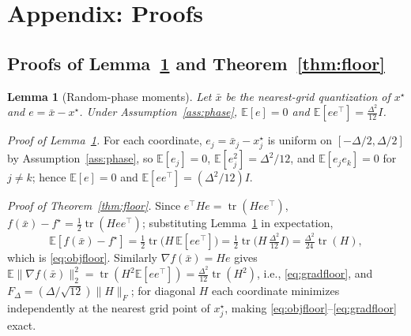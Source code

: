 \documentclass{article}
\newtheorem{lemma}{Lemma}
\newcommand{\E}{\mathbb{E}}
\newcommand{\D}{\Delta}
\begin{document}
\section{Appendix: Proofs}
\subsection{Proofs of Lemma~\ref{lem:phase} and Theorem~\ref{thm:floor}}
\begin{lemma}[Random-phase moments]
\label{lem:phase}
Let $\bar x$ be the nearest-grid quantization of $x^\star$ and $e=\bar x-x^\star$. Under Assumption~\ref{ass:phase}, $\E[e]=0$ and $\E[ee^\top]=\frac{\D^2}{12}I$.
\end{lemma}
\emph{Proof of Lemma~\ref{lem:phase}.} For each coordinate, $e_j=\bar x_j-x_j^\star$ is uniform on $[-\D/2,\D/2]$ by Assumption~\ref{ass:phase}, so $\E[e_j]=0$, $\E[e_j^2]=\D^2/12$, and $\E[e_je_k]=0$ for $j\ne k$; hence $\E[e]=0$ and $\E[ee^\top]=(\D^2/12)I$.

\emph{Proof of Theorem~\ref{thm:floor}.} Since $e^\top He=\operatorname{tr}(Hee^\top)$, $f(\bar x)-f^\star=\frac12\operatorname{tr}(Hee^\top)$; substituting Lemma~\ref{lem:phase} in expectation,
\[
\E[f(\bar x)-f^\star]=\tfrac12\operatorname{tr}\big(H\,\E[ee^\top]\big)=\tfrac12\operatorname{tr}\big(H\,\tfrac{\D^2}{12}I\big)=\tfrac{\D^2}{24}\operatorname{tr}(H),
\]
which is \eqref{eq:objfloor}. Similarly $\nabla f(\bar x)=He$ gives $\E\|\nabla f(\bar x)\|_2^2=\operatorname{tr}(H^2\E[ee^\top])=\frac{\D^2}{12}\operatorname{tr}(H^2)$, i.e., \eqref{eq:gradfloor}, and $F_{\D}=(\D/\sqrt{12})\|H\|_F$; for diagonal $H$ each coordinate minimizes independently at the nearest grid point of $x_j^\star$, making \eqref{eq:objfloor}--\eqref{eq:gradfloor} exact.
\end{document}
